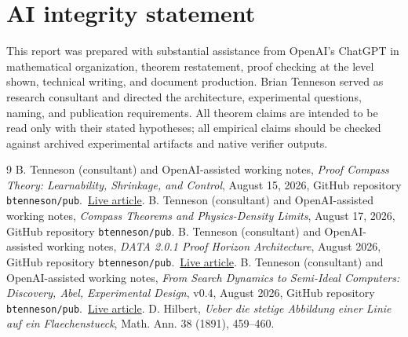 \documentclass[11pt]{article}
\begin{document}
\section*{AI integrity statement}
This report was prepared with substantial assistance from OpenAI's ChatGPT in mathematical organization, theorem restatement, proof checking at the level shown, technical writing, and document production. Brian Tenneson served as research consultant and directed the architecture, experimental questions, naming, and publication requirements. All theorem claims are intended to be read only with their stated hypotheses; all empirical claims should be checked against archived experimental artifacts and native verifier outputs.
\begin{thebibliography}{9}
 B. Tenneson (consultant) and OpenAI-assisted working notes, \emph{Proof Compass Theory: Learnability, Shrinkage, and Control}, August 15, 2026, GitHub repository \texttt{btenneson/pub}.\ \href{https://btenneson.github.io/pub/papers/proof_compass_theory/}{Live article}.
 B. Tenneson (consultant) and OpenAI-assisted working notes, \emph{Compass Theorems and Physics-Density Limits}, August 17, 2026, GitHub repository \texttt{btenneson/pub}.
 B. Tenneson (consultant) and OpenAI-assisted working notes, \emph{DATA 2.0.1 Proof Horizon Architecture}, August 2026, GitHub repository \texttt{btenneson/pub}.\ \href{https://btenneson.github.io/pub/papers/data_2_0_1_proof_horizon_architecture/}{Live article}.
 B. Tenneson (consultant) and OpenAI-assisted working notes, \emph{From Search Dynamics to Semi-Ideal Computers: Discovery, Abel, Experimental Design}, v0.4, August 2026, GitHub repository \texttt{btenneson/pub}.\ \href{https://btenneson.github.io/pub/papers/search_dynamics_abel_v0_4/}{Live article}.
 D. Hilbert, \emph{Ueber die stetige Abbildung einer Linie auf ein Flaechenstueck}, Math. Ann. 38 (1891), 459--460.
\end{thebibliography}
\end{document}
